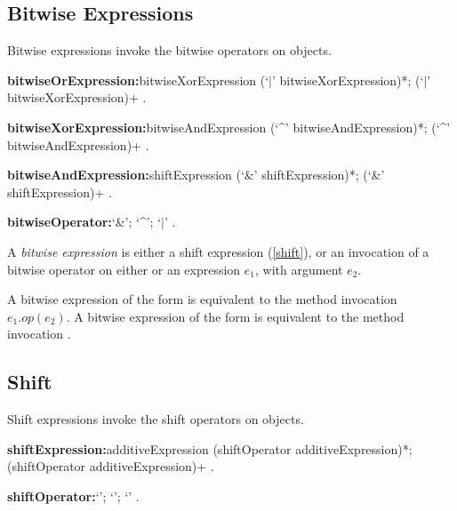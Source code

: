 \documentclass{article}
\begin{document}
\subsection{Bitwise Expressions}

\LMHash{}
Bitwise expressions invoke the bitwise operators on objects.

\begin{grammar}
{\bf bitwiseOrExpression:}bitwiseXorExpression (`$|$' bitwiseXorExpression)*;
  \SUPER{} (`$|$' bitwiseXorExpression)+
  .

{\bf bitwiseXorExpression:}bitwiseAndExpression (`\^{}' bitwiseAndExpression)*;
  \SUPER{} (`\^{}' bitwiseAndExpression)+
  .

{\bf bitwiseAndExpression:}shiftExpression (`\&' shiftExpression)*;
  \SUPER{} (`\&' shiftExpression)+
  .

{\bf bitwiseOperator:}`\&';
  `\^{}';
  `$|$'
  .
\end{grammar}

\LMHash{}
A {\em bitwise expression} is either a shift expression (\ref{shift}), or an invocation of a bitwise operator on either \SUPER{} or an expression $e_1$, with argument $e_2$.

\LMHash{}
A bitwise expression of the form  is equivalent to the method invocation $e_1.op(e_2)$.
A bitwise expression of the form  is equivalent to the method invocation .



\subsection{Shift}

\LMHash{}
Shift expressions invoke the shift operators on objects.

\begin{grammar}
{\bf shiftExpression:}additiveExpression (shiftOperator additiveExpression)*;
  \SUPER{} (shiftOperator additiveExpression)+
  .

{\bf shiftOperator:}`{\escapegrammar \lt\lt'};
  `{\escapegrammar \gt\gt}';
  `{\escapegrammar \gt \gt \gt}'
  .
\end{grammar}
\end{document}
